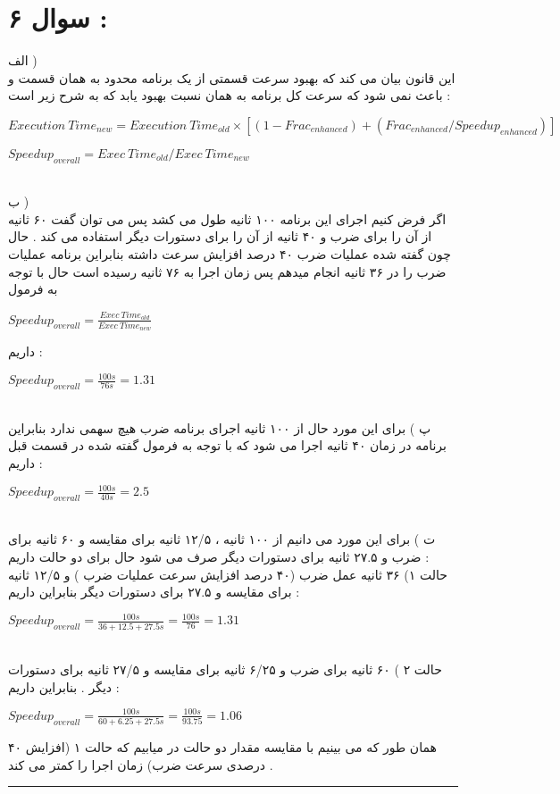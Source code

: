 \documentclass{article}
\begin{document}
	\section*{سوال ۶ : }
	الف )‌
	\\
	این قانون بیان می کند که بهبود سرعت قسمتی از یک برنامه محدود به همان قسمت و باعث نمی شود که سرعت کل برنامه به همان نسبت بهبود یابد که به شرح زیر است  : 
	\begin{center}
		$ Execution \ Time _{new} = Execution \ Time _{old} \times [(1-Frac_{enhanced}) + (Frac_{enhanced}  / Speedup_{enhanced})]$
	\end{center}
\begin{center}
	$ Speedup_{overall} = Exec \ Time_{old} / Exec \ Time _{new}$
\end{center}
\\
ب ) 
\\
اگر فرض کنیم اجرای این برنامه ۱۰۰ ثانیه طول می کشد پس می توان گفت ۶۰ ثانیه از آن را برای ضرب و ۴۰ ثانیه از آن را برای دستورات دیگر استفاده می کند  . حال چون گفته شده عملیات ضرب ۴۰ درصد افزایش سرعت داشته بنابراین برنامه عملیات ضرب را در ۳۶ ثانیه انجام میدهم  پس زمان اجرا به ۷۶ ثانیه رسیده است حال  با توجه به فرمول 
\begin{center}
$Speedup_{overall} = \frac {Exec \ Time_{old}}{Exec \ Time_{new}}$
\end{center}

داریم  : 
\begin{center}
	$Speedup_{overall}  = \frac{100s}{76s} = 1.31$
\end{center}
\\
پ ) برای این مورد حال از ۱۰۰ ثانیه اجرای برنامه ضرب هیچ سهمی ندارد بنابراین برنامه در زمان ۴۰ ثانیه اجرا می شود که با توجه به فرمول گفته شده در قسمت قبل داریم : 
\begin{center}
	$Speedup_{overall}  = \frac{100s}{40s} = 2.5$
\end{center}
\\
ت ) برای این مورد می دانیم از ۱۰۰ ثانیه ، ۱۲/۵ ثانیه برای مقایسه و ۶۰ ثانیه برای ضرب و ۲۷.۵ ثانیه برای دستورات دیگر صرف می شود حال برای دو حالت داریم  : 
\\ 
حالت ۱) ۳۶ ثانیه عمل ضرب (۴۰ درصد افزایش سرعت عملیات ضرب ) و ۱۲/۵ ثانیه برای مقایسه و ۲۷.۵ برای دستورات دیگر  بنابراین داریم  : 
\begin{center}
  $Speedup_{overall}  = \frac{100s}{36 + 12.5 + 27.5s} = \frac{100s}{76} = 1.31$
\end{center}
\\
حالت ۲ ) ۶۰ ثانیه برای ضرب و ۶/۲۵ ثانیه برای مقایسه و ۲۷/۵ ثانیه برای دستورات دیگر . بنابراین داریم : 
\begin{center}
 $Speedup_{overall}  = \frac{100s}{60 + 6.25 + 27.5s} = \frac{100s}{93.75} = 1.06$
\end{center}
همان طور که می بینیم با مقایسه مقدار دو حالت در میابیم که حالت ۱ (افزایش ۴۰ درصدی سرعت ضرب) زمان اجرا را کمتر می کند  . 
\hrule
\end{document}
